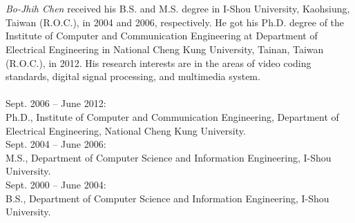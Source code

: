 \newpage
\chapter*{\nameVita} %

\noindent
{\it Bo-Jhih Chen} received his B.S. and M.S. degree in I-Shou University, Kaohsiung, Taiwan (R.O.C.), in 2004 and 2006, respectively. He got his Ph.D. degree of the Institute of Computer and Communication Engineering at Department of Electrical Engineering in National Cheng Kung University, Tainan, Taiwan (R.O.C.), in 2012.
His research interests are in the areas of video coding standards, digital signal processing, and multimedia system.
\bigskip \\
\\
\noindent Sept. 2006 -- June 2012:\\
	Ph.D., Institute of Computer and Communication Engineering, Department of Electrical Engineering, National Cheng Kung University.\\
\noindent Sept. 2004 -- June 2006:\\
	M.S., Department of Computer Science and Information Engineering, I-Shou University.\\
\noindent Sept. 2000 -- June 2004:\\
	B.S., Department of Computer Science and Information Engineering, I-Shou University.